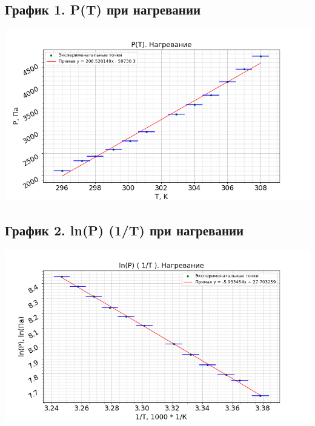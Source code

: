 \documentclass[15pt,a5paper,reqno]{article}
\begin{document}
    \subsection{График 1. P(T) при нагревании}
    \begin{center}
        \includegraphics[width = \textwidth]{График 1.png}
    \end{center}
    
    \subsection{График 2. ln(P) (1/T) при нагревании}
    \begin{center}
        \includegraphics[width = \textwidth]{График 2.png}
    \end{center}
    
\end{document}
